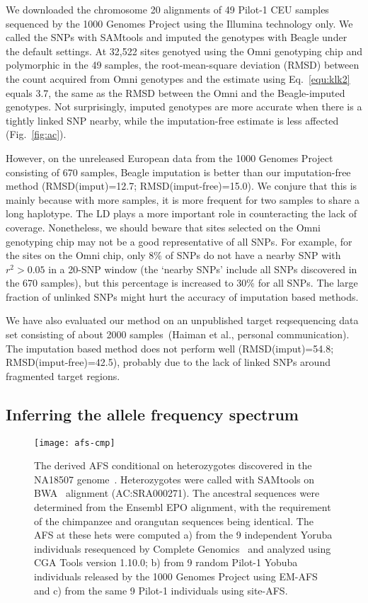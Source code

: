 \documentclass{bioinfo}
\begin{document}
We downloaded the chromosome 20 alignments of 49 Pilot-1 CEU samples sequenced
by the 1000 Genomes Project using the Illumina technology only. We called the
SNPs with SAMtools and imputed the genotypes with Beagle under the default
settings. At 32,522 sites genotyed using the Omni genotyping chip and
polymorphic in the 49 samples, the root-mean-square deviation (RMSD) between
the count acquired from Omni genotypes and the estimate using
Eq.~\eqref{equ:klk2} equals 3.7, the same as the RMSD between the Omni and the
Beagle-imputed genotypes.  Not surprisingly, imputed genotypes are more
accurate when there is a tightly linked SNP nearby, while the imputation-free
estimate is less affected (Fig.~\ref{fig:ac}).

However, on the unreleased European data from the 1000 Genomes Project
consisting of 670 samples, Beagle imputation is better than our imputation-free
method (RMSD(imput)=12.7; RMSD(imput-free)=15.0).  We conjure that this is
mainly because with more samples, it is more frequent for two samples to share
a long haplotype.  The LD plays a more important role in counteracting the lack
of coverage.  Nonetheless, we should beware that sites selected on the Omni
genotyping chip may not be a good representative of all SNPs. For example, for
the sites on the Omni chip, only 8\% of SNPs do not have a nearby SNP with
$r^2>0.05$ in a 20-SNP window (the `nearby SNPs' include all SNPs discovered in
the 670 samples), but this percentage is increased to 30\% for all SNPs.  The
large fraction of unlinked SNPs might hurt the accuracy of imputation based
methods.

We have also evaluated our method on an unpublished target reqsequencing data
set consisting of about 2000 samples~(Haiman et al., personal communication).
The imputation based method does not perform well (RMSD(imput)=54.8;
RMSD(imput-free)=42.5), probably due to the lack of linked SNPs around
fragmented target regions.

\subsection{Inferring the allele frequency spectrum}
\begin{figure}[tb]
\centering
\texttt{[image: afs-cmp]}
\caption{The derived AFS conditional on heterozygotes discovered in the NA18507
genome~\citep{Bentley:2008cr}. Heterozygotes were called with SAMtools on
BWA~\citep{Li:2009uq} alignment (AC:SRA000271).  The ancestral sequences were
determined from the Ensembl EPO alignment, with the requirement of the
chimpanzee and orangutan sequences being identical.  The AFS at these hets were
computed a) from the 9 independent Yoruba individuals resequenced by Complete
Genomics~\citep{Drmanac:2010ly} and analyzed using CGA Tools version 1.10.0; b)
from 9 random Pilot-1 Yobuba individuals released by the 1000 Genomes Project
using EM-AFS and c) from the same 9 Pilot-1 individuals using
site-AFS.}\label{fig:afs}
\end{figure}
\end{document}
